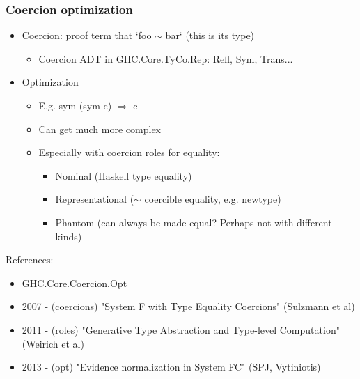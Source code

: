 \documentclass[aspectratio=169]{beamer}
\begin{document}
\begin{frame}
  \frametitle{Coercion optimization}
  \begin{itemize}
    \item Coercion: proof term that `foo $\sim$ bar` (this is its type)
      \begin{itemize}
    \item Coercion ADT in GHC.Core.TyCo.Rep: Refl, Sym, Trans...
      \end{itemize}
    \item Optimization
      \begin{itemize}
    \item E.g. sym (sym c) $\Longrightarrow$ c
    \item Can get much more complex
    \item Especially with coercion roles for equality:
      \begin{itemize}
        \item Nominal (Haskell type equality)
        \item Representational ($\sim$ coercible equality, e.g. newtype)
        \item Phantom (can always be made equal? Perhaps not with different kinds)
      \end{itemize}
      \end{itemize}
  \end{itemize}

  References:
  \begin{itemize}
    \item GHC.Core.Coercion.Opt
    \item 2007 - (coercions) "System F with Type Equality Coercions" (Sulzmann
      et al)
    \item 2011 - (roles) "Generative Type Abstraction and Type-level Computation" (Weirich et al)
    \item 2013 - (opt) "Evidence normalization in System FC" (SPJ, Vytiniotis)
  \end{itemize}
\end{frame}
\end{document}
